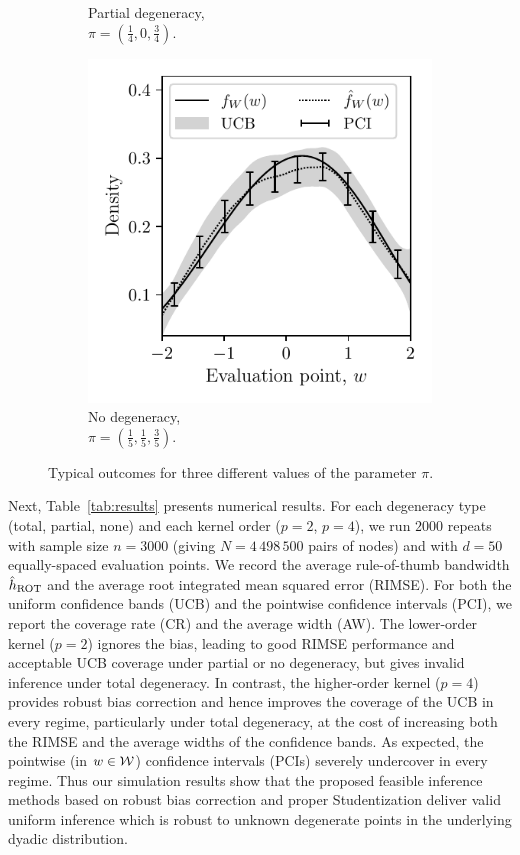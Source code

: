 \begin{figure}[t]
\begin{subfigure}{0.32\textwidth}
    \caption{Partial degeneracy, \\
    $\pi = \left( \frac{1}{4}, 0, \frac{3}{4} \right)$.}
  \end{subfigure}
  \begin{subfigure}{0.32\textwidth}
    \centering
    \includegraphics[scale=0.64]{graphics/outcome_plot_none.pdf}
    \caption{No degeneracy, \\
    $\pi = \left( \frac{1}{5}, \frac{1}{5}, \frac{3}{5} \right)$.}
  \end{subfigure}
  \caption[Typical outcomes for different values of the parameter $\pi$]
  {Typical outcomes for three different values of the parameter $\pi$.}
  \label{fig:results}
\end{figure}

Next, Table~\ref{tab:results} presents numerical results. For each degeneracy
type (total, partial, none) and each kernel order ($p=2$, $p=4$), we run $2000$
repeats with sample size $n=3000$ (giving $N=4\,498\,500$ pairs of nodes) and
with $d=50$ equally-spaced evaluation points. We record the average
rule-of-thumb bandwidth $\hat{h}_{\operatorname{ROT}}$ and the average root integrated mean
squared error (RIMSE). For both the uniform confidence bands (UCB) and the
pointwise confidence intervals (PCI), we report the coverage rate (CR) and the
average width (AW).
%
The lower-order kernel ($p=2$) ignores the bias, leading to good RIMSE
performance and acceptable UCB coverage under partial or no degeneracy, but
gives invalid inference under total degeneracy. In contrast, the higher-order
kernel ($p=4$) provides robust bias correction and hence improves the coverage
of the UCB in every regime, particularly under total degeneracy, at the cost of
increasing both the RIMSE and the average widths of the confidence bands.
%
As expected, the pointwise (in $w\in\mathcal{W}$) confidence intervals (PCIs) severely
undercover in every regime. Thus our simulation results show that the proposed
feasible inference methods based on robust bias correction and proper
Studentization deliver valid uniform inference which is robust to unknown
degenerate points in the underlying dyadic distribution.

